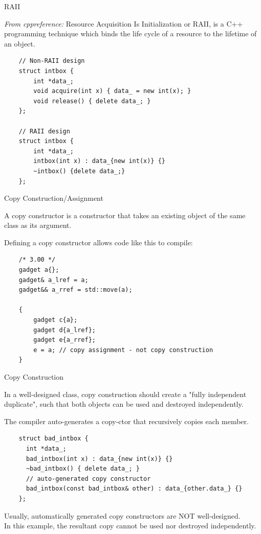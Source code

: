 \begin{frame}[fragile]{RAII}
  \begin{sqt:definition}
  \emph{From cppreference:} Resource Acquisition Is Initialization or RAII, is a C++ programming technique which binds the life cycle of a resource to the lifetime of an object. 
  \end{sqt:definition}

  \begin{verbatim}
    // Non-RAII design
    struct intbox {
        int *data_;
        void acquire(int x) { data_ = new int(x); }
        void release() { delete data_; }
    };

    // RAII design
    struct intbox {
        int *data_;
        intbox(int x) : data_{new int(x)} {}
        ~intbox() {delete data_;}
    };
  \end{verbatim}
\end{frame}

\begin{frame}[fragile]{Copy Construction/Assignment}
  \begin{sqt:definition}
    A copy constructor is a constructor that takes an existing object of the same class as its argument.
  \end{sqt:definition}
  Defining a copy constructor allows code like this to compile:
  \begin{verbatim}
    /* 3.00 */
    gadget a{};
    gadget& a_lref = a;
    gadget&& a_rref = std::move(a);

    {
        gadget c{a};
        gadget d{a_lref};
        gadget e{a_rref};
        e = a; // copy assignment - not copy construction
    }
  \end{verbatim}
\end{frame}

\begin{frame}[fragile]{Copy Construction}
  \begin{sqt:result}
    In a well-designed class, copy construction should create a "fully independent duplicate", such that
    both objects can be used and destroyed independently.
  \end{sqt:result}

  The compiler auto-generates a copy-ctor that recursively copies each member.
  \begin{verbatim}
    struct bad_intbox {
      int *data_;
      bad_intbox(int x) : data_{new int(x)} {}
      ~bad_intbox() { delete data_; }
      // auto-generated copy constructor
      bad_intbox(const bad_intbox& other) : data_{other.data_} {}
    };
  \end{verbatim}
  Usually, automatically generated copy constructors are NOT well-designed.\\
  In this example, the resultant copy cannot be used nor destroyed independently.
\end{frame}

